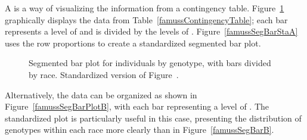 A  is a way of visualizing the information from a contingency table. Figure~\ref{famussSegBarPlotA} graphically displays the data from Table~\ref{famussContingencyTable}; each bar represents a level of  and is divided by the levels of . Figure~\ref{famussSegBarStaA} uses the row proportions to create a standardized segmented bar plot. 


\begin{figure}[h!]
	\centering
	\caption{ Segmented bar plot for individuals by genotype, with bars divided by race.  Standardized version of Figure~.}
	\label{famussSegBarPlotA}
\end{figure}

Alternatively, the data can be organized as shown in Figure~\ref{famussSegBarPlotB}, with each bar representing a level of . The standardized plot is particularly useful in this case, presenting the distribution of genotypes within each race more clearly than in Figure~\ref{famussSegBarB}.

